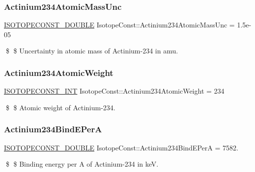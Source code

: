 \subsubsection{\texorpdfstring{Actinium234\+Atomic\+Mass\+Unc}{Actinium234AtomicMassUnc}}
{\footnotesize\ttfamily \mbox{\hyperlink{group___isotope_const-_macros_ga8f45a7272ce02c0b4c65c44636ed719a}{I\+S\+O\+T\+O\+P\+E\+C\+O\+N\+S\+T\+\_\+\+D\+O\+U\+B\+LE}} Isotope\+Const\+::\+Actinium234\+Atomic\+Mass\+Unc = 1.\+5e-\/05}

\$ \$ Uncertainty in atomic mass of Actinium-\/234 in amu. \mbox{\label{group___isotope_const-_actinium-_ac234_gafc6430ba1fd954326995d8efc33f55d9}} 
\subsubsection{\texorpdfstring{Actinium234\+Atomic\+Weight}{Actinium234AtomicWeight}}
{\footnotesize\ttfamily \mbox{\hyperlink{group___isotope_const-_macros_ga5f18360b3e99483a35c32d789e62621c}{I\+S\+O\+T\+O\+P\+E\+C\+O\+N\+S\+T\+\_\+\+I\+NT}} Isotope\+Const\+::\+Actinium234\+Atomic\+Weight = 234}

\$ \$ Atomic weight of Actinium-\/234. \mbox{\label{group___isotope_const-_actinium-_ac234_gace67ba8576f895ac2b94d367af3b5b06}} 
\subsubsection{\texorpdfstring{Actinium234\+Bind\+E\+PerA}{Actinium234BindEPerA}}
{\footnotesize\ttfamily \mbox{\hyperlink{group___isotope_const-_macros_ga8f45a7272ce02c0b4c65c44636ed719a}{I\+S\+O\+T\+O\+P\+E\+C\+O\+N\+S\+T\+\_\+\+D\+O\+U\+B\+LE}} Isotope\+Const\+::\+Actinium234\+Bind\+E\+PerA = 7582.}

\$ \$ Binding energy per A of Actinium-\/234 in keV. \mbox{\label{group___isotope_const-_actinium-_ac234_gafb94545632aed4b83c67828ee1138429}} 
